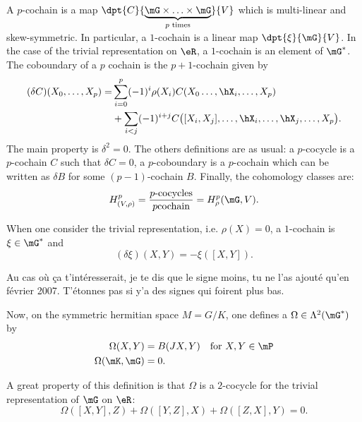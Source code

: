A $p$-cochain is a map $\dpt{C}{\underbrace{\mG\times\ldots\times\mG}_{p \text{ times}}}{V}$ which is multi-linear and skew-symmetric. In particular, a $1$-cochain is a linear map $\dpt{\xi}{\mG}{V}$. In the case of the trivial representation on $\eR$, a $1$-cochain is an element of $\mG^*$. The coboundary of a $p$ cochain is the $p+1$-cochain given by
\begin{equation}
\begin{split}
(\delta C)(X_0,\ldots,X_p)=&\sum_{i=0}^{p}(-1)^i\rho(X_i)C(X_0\ldots,\hX_i,\ldots,X_p)\\
                           &+\sum_{i<j}(-1)^{i+j}C\big(  [X_i,X_j],\ldots,\hX_i,\ldots,\hX_j,\ldots,X_p \big).
\end{split}
\end{equation}
The main property is $\delta^2=0$. The others definitions are as usual: a $p$-cocycle is a $p$-cochain $C$ such that $\delta C=0$, a $p$-coboundary is a $p$-cochain which can be written as $\delta B$ for some  $(p-1)$-cochain $B$. Finally, the cohomology classes are:
\begin{equation}
    H^{p}_{(V,\rho)}=\frac{p\text{-cocycles}}{p\text{cochain}}=H^p_{\rho}(\mG,V).
\end{equation}

When one consider the trivial representation, i.e. $\rho(X)=0$, a $1$-cochain is $\xi\in\mG^*$ and
\begin{equation}  \label{EqDefcochaintrivC}
(\delta\xi)(X,Y)=-\xi([X,Y]).
\end{equation}

\begin{probleme}
Au cas où ça t'intéresserait, je te dis que le signe moins, tu ne l'as ajouté qu'en février 2007. T'étonnes pas si y'a des signes qui foirent plus bas.
\end{probleme}

Now, on the symmetric hermitian space $M=G/K$, one defines a $\Omega\in\Lambda^2(\mG^*)$ by
\begin{subequations}
\begin{align}
   \Omega(X,Y)&=B(JX,Y)&\text{for }X,Y\in\mP  \label{eq:def_Omega_1}    \\
   \Omega(\mK,\mG)&=0.                          \label{eq:def_Omega_2} 
\end{align}
\end{subequations}   

A great property of this definition is that $\Omega$ is a $2$-cocycle for the trivial representation of $\mG$ on $\eR$:
\[
\Omega([X,Y],Z)+\Omega([Y,Z],X)+\Omega([Z,X],Y)=0.
\]

